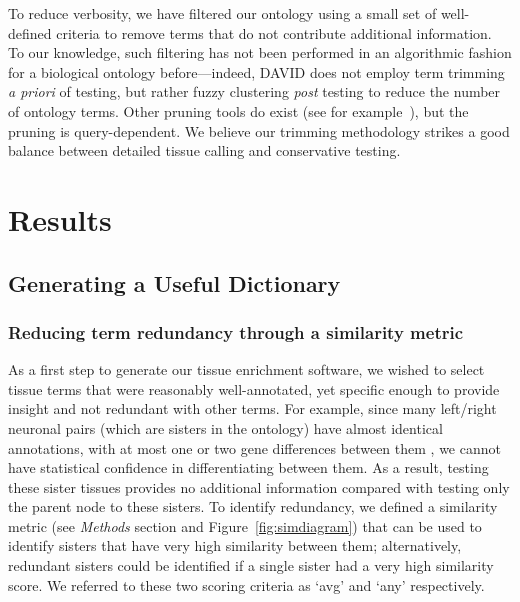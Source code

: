 \documentclass{bmcart}
\begin{document}
 To reduce verbosity, we have filtered our ontology using a small set of well-defined criteria to remove terms that do not contribute additional information. To our knowledge, such filtering has not been performed in an algorithmic fashion for a biological ontology before---indeed, DAVID does not employ term trimming \emph{a priori} of testing, but rather fuzzy clustering \emph{post} testing to reduce the number of ontology terms. Other pruning tools do exist (see for example~\cite{Kim2007}), but the pruning is query-dependent. We believe our trimming methodology strikes a good balance between detailed tissue calling and conservative testing.


\section*{Results}
\subsection*{Generating a Useful Dictionary}
\subsubsection*{Reducing term redundancy through a similarity metric}
As a first step to generate our tissue enrichment software, we wished to select tissue terms that were reasonably well-annotated, yet specific enough to provide insight and not redundant with other terms. %
For example, since many left/right neuronal pairs (which are sisters in the ontology) have almost identical annotations, with at most one or two gene differences between them%
, we cannot have statistical confidence in differentiating between them. As a result, testing these sister tissues provides no additional information compared with testing only the parent node to these sisters. %
To identify redundancy, we defined a similarity metric (see \emph{Methods} section and Figure~\ref{fig:simdiagram}) that can be used to identify sisters that have very high similarity between them; alternatively, redundant sisters could be identified if a single sister had a very high similarity score. We referred to these two scoring criteria as `avg' and `any' respectively.
\end{document}
